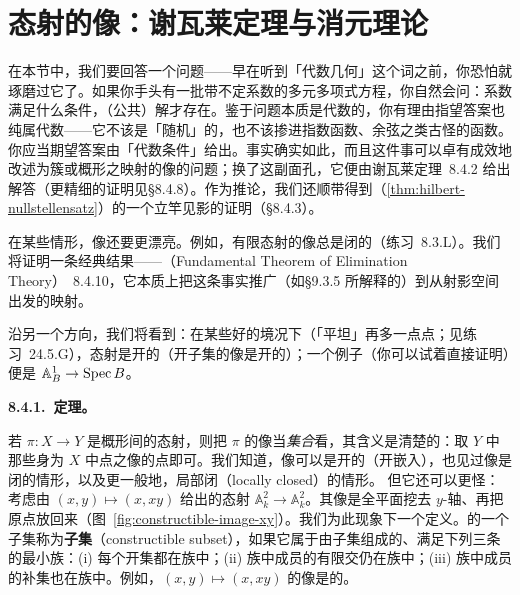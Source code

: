 
\section{态射的像：谢瓦莱定理与消元理论}

在本节中，我们要回答一个问题——早在听到「代数几何」这个词之前，你恐怕就琢磨过它了。如果你手头有一批带不定系数的多元多项式方程，你自然会问：系数满足什么条件，（公共）解才存在。鉴于问题本质是代数的，你有理由指望答案也纯属代数——它不该是「随机」的，也不该掺进指数函数、余弦之类古怪的函数。你应当期望答案由「代数条件」给出。事实确实如此，而且这件事可以卓有成效地改述为簇或概形之映射的像的问题；换了这副面孔，它便由谢瓦莱定理~8.4.2 给出解答（更精细的证明见\S8.4.8）。作为推论，我们还顺带得到\trNullstellensatz（\cref{thm:hilbert-nullstellensatz}）的一个立竿见影的证明（\S8.4.3）。

在某些情形，像还要更漂亮。例如，有限态射的像总是闭的（\mbox{练习~8.3.L}）。我们将证明一条经典结果——\trFundamentalTheoremOfEliminationTheory{}（Fundamental Theorem of Elimination Theory）~8.4.10，它本质上把这条事实推广（如\S9.3.5 所解释的）到从射影空间出发的映射。

沿另一个方向，我们将看到：在某些好的境况下（「平坦」再多一点点；见\mbox{练习~24.5.G}），态射是开的（开子集的像是开的）；一个例子（你可以试着直接证明）便是 $\mathbb{A}^1_B\to\operatorname{Spec} B$。

\textbf{8.4.1.\ \trChevalley{}定理。}

若 $\pi\colon X\to Y$ 是概形间的态射，则把 $\pi$ 的像当\emph{集合}看，其含义是清楚的：取 $Y$ 中那些身为 $X$ 中点之像的点即可。我们知道，像可以是开的（开嵌入），也见过像是闭的情形，以及更一般地，局部闭（locally closed）的情形。
但它还可以更怪：考虑由 $(x,y)\mapsto(x,xy)$ 给出的态射 $\mathbb{A}^2_k\to\mathbb{A}^2_k$。其像是全平面挖去 $y$-轴、再把原点放回来（图~\ref{fig:constructible-image-xy}）。我们为此现象下一个定义。\trNoetherian\trTopologicalSpace{}的一个子集称为\textbf{\trConstructible{}子集}（constructible subset），如果它属于由子集组成的、满足下列三条的最小族：(i) 每个开集都在族中；(ii) 族中成员的有限交仍在族中；(iii) 族中成员的补集也在族中。例如，$(x,y)\mapsto(x,xy)$ 的像是\trConstructible{}的。


